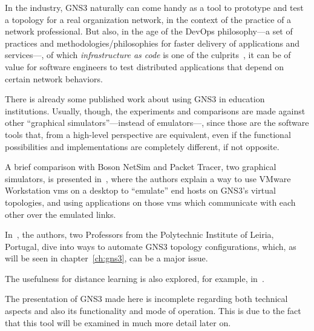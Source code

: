 In the industry, GNS3 naturally can come handy as a tool to prototype and test a topology for a real organization network, in the context of the practice of a network professional.
But also, in the age of the DevOps philosophy---a set of practices and methodologies/philosophies for faster delivery of applications and services---, of which \emph{infrastructure as code} is one of the culprits~\cite{awswhatisdevops}, it can be of value for software engineers to test distributed applications that depend on certain network behaviors.


There is already some published work about using GNS3 in education institutions.
Usually, though, the experiments and comparisons are made against other ``graphical simulators''---instead of emulators---, since those are the software tools that, from a high-level perspective are equivalent, even if the functional possibilities and implementations are completely different, if not opposite.

A brief comparison with Boson NetSim and Packet Tracer, two graphical simulators, is presented in~\cite{virtlabgnsvmware}, where the authors explain a way to use VMware Workstation \glspl{vm} on a desktop to ``emulate'' end hosts on GNS3's virtual topologies, and using applications on those \glspl{vm} which communicate with each other over the emulated links.

In~\cite{automaticnetconfiggns}, the authors, two Professors from the Polytechnic Institute of Leiria, Portugal, dive into ways to automate GNS3 topology configurations, which, as will be seen in chapter~\ref{ch:gns3}, can be a major issue. %

The usefulness for distance learning is also explored, for example, in~\cite{networkvirtwithgns}.

The presentation of GNS3 made here is incomplete regarding both technical aspects and also its functionality and mode of operation.
This is due to the fact that this tool will be examined in much more detail later on.

